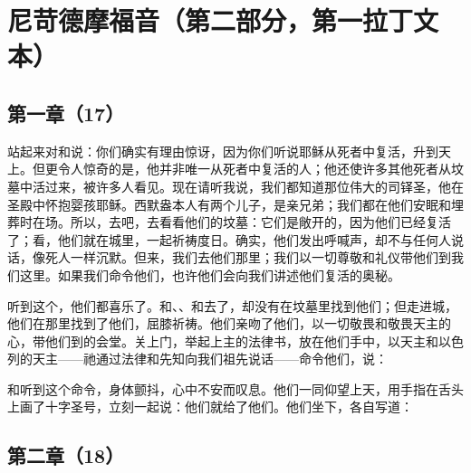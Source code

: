 
\section{尼苛德摩福音（第二部分，第一拉丁文本）}

\par


\subsection{第一章（17）}

站起来对和说：你们确实有理由惊讶，因为你们听说耶稣从死者中复活，升到天上。但更令人惊奇的是，他并非唯一从死者中复活的人；他还使许多其他死者从坟墓中活过来，被许多人看见。现在请听我说，我们都知道那位伟大的司铎圣，他在圣殿中怀抱婴孩耶稣。西默盎本人有两个儿子，是亲兄弟；我们都在他们安眠和埋葬时在场。所以，去吧，去看看他们的坟墓：它们是敞开的，因为他们已经复活了；看，他们就在城里，一起祈祷度日。确实，他们发出呼喊声，却不与任何人说话，像死人一样沉默。但来，我们去他们那里；我们以一切尊敬和礼仪带他们到我们这里。如果我们命令他们，也许他们会向我们讲述他们复活的奥秘。\par

听到这个，他们都喜乐了。和、、和去了，却没有在坟墓里找到他们；但走进城，他们在那里找到了他们，屈膝祈祷。他们亲吻了他们，以一切敬畏和敬畏天主的心，带他们到的会堂。关上门，举起上主的法律书，放在他们手中，以天主和以色列的天主——祂通过法律和先知向我们祖先说话——命令他们，说：\par

和听到这个命令，身体颤抖，心中不安而叹息。他们一同仰望上天，用手指在舌头上画了十字圣号，立刻一起说：他们就给了他们。他们坐下，各自写道：\par


\subsection{第二章（18）}

